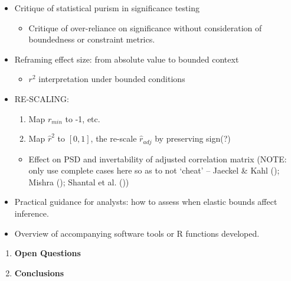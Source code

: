 \documentclass[
  12pt,
]{article}
\providecommand{\tightlist}{%
  \setlength{\itemsep}{0pt}\setlength{\parskip}{0pt}}
\theoremstyle{plain}
\theoremstyle{definition}
\theoremstyle{remark}
\begin{document}
\begin{itemize}
\tightlist
\item
  Critique of statistical purism in significance testing

  \begin{itemize}
  \tightlist
  \item
    Critique of over-reliance on significance without consideration of
    boundedness or constraint metrics.
  \end{itemize}
\item
  Reframing effect size: from absolute value to bounded context

  \begin{itemize}
  \tightlist
  \item
    \(r^2\) interpretation under bounded conditions
  \end{itemize}
\item
  RE-SCALING:

  \begin{enumerate}
  \def\labelenumi{\arabic{enumi}.}
  \tightlist
  \item
    Map \(r_{min}\) to -1, etc.
  \item
    Map \(\hat{r}^2\) to \([0,1]\), the re-scale \(\hat{r}_{adj}\) by
    preserving sign(?)
  \end{enumerate}

  \begin{itemize}
  \tightlist
  \item
    Effect on PSD and invertability of adjusted correlation matrix
    (NOTE: only use complete cases here so as to not `cheat' -- Jaeckel
    \& Kahl (); Mishra
    (); Shantal et al.
    ())
  \end{itemize}
\item
  Practical guidance for analysts: how to assess when elastic bounds
  affect inference.
\item
  Overview of accompanying software tools or R functions developed.
\end{itemize}

\begin{enumerate}
\def\labelenumi{\arabic{enumi}.}
\setcounter{enumi}{6}
\item
  \textbf{Open Questions}
\item
  \textbf{Conclusions}
\end{enumerate}
\end{document}
